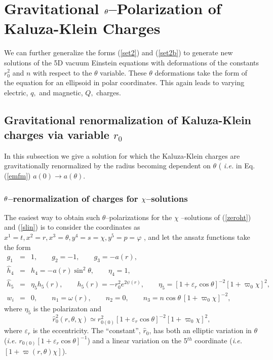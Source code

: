 \documentclass[a4paper,preprint,prabib,aps]{revtex4}
\begin{document}
\section{Gravitational $\protect\theta$--Polarization of Kaluza-Klein Charges%
}

We can further generalize the forms (\ref{set2}) and (\ref{set2b}) to
generate new solutions of the 5D vacuum Einstein equations with deformations
of the constants $r_0^2$ and $n$ with respect to the $\theta$ variable.
These $\theta$ deformations take the form of the equation for an ellipsoid
in polar coordinates. This again leads to varying electric, $q,$ and
magnetic, $Q,$ charges.

\subsection{Gravitational renormalization of Kaluza-Klein charges via
variable $r_0$}

In this subsection we give a solution for which the Kaluza-Klein charges are
gravitationally renormalized by the radius becoming dependent on $\theta$ (%
{\it i.e.} in Eq. (\ref{emfm}) $a(0) \rightarrow a(\theta )$.

\subsubsection{$\protect\theta$--renormalization of charges for $\protect\chi
$--solutions}

The easiest way to obtain such $\theta $--polarizations for the $\chi $%
--solutions of (\ref{zeroht}) and (\ref{slin}) is to consider the
coordinates as $x^{1}=t,x^{2}=r,x^{3}=\theta ,y^{4}=s=\chi ,y^{5}=p=\varphi $%
, and let the ansatz functions take the form
\begin{eqnarray}
g_{1} &=&1,\qquad g_{2}=-1,\qquad g_{3}=-a(r),  \label{set4a} \\
\widehat{h}_{4} &=&h_{4}=-a(r)\sin ^{2}\theta ,\qquad \eta _{4}=1,  \nonumber
\\
\widehat{h}_{5} &=&\eta _{5}h_{5}(r),\qquad h_{5}(r)=-r_{0}^{2}e^{2\psi
(r)},\qquad \eta _{5}=\left[ 1+\varepsilon _{r}\cos \theta \right]
^{-2}[1+\varpi _{0}\chi ]^{2},  \nonumber \\
w_{i} &=&0,\qquad n_{1}=\omega (r),\qquad n_{2}=0,\qquad n_{3}=n\cos \theta
\ [1+\varpi _{0}\chi ]^{-2},  \nonumber
\end{eqnarray}
where $\eta _{5}$ is the polarizaton  and
\[
\widehat{r}_{0}^{2}(r,\theta ,\chi )\simeq r_{0(0)}^{2}\left[ 1+\varepsilon
_{r}\cos \theta \right] ^{-2}[1+\varpi _{0}\chi ]^{2},
\]
where $\varepsilon _{r}$ is the eccentricity. The ``constant'', $\widehat{r}%
_{0}$, has both an elliptic variation in $\theta $ ({\it i.e.} $r_{0(0)}%
\left[ 1+\varepsilon _{r}\cos \theta \right] ^{-1}$) and a linear variation
on the 5$^{th}$ coordinate ({\it i.e.} $[1+\varpi (r,\theta )\chi ]$).
\end{document}
